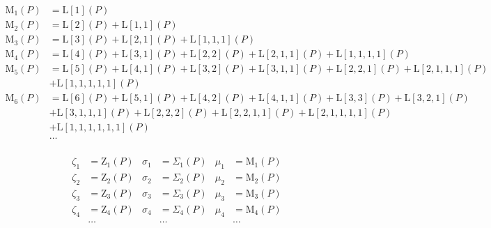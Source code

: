 \begin{equation*} \begin{aligned}
\mathrm{M}_1(P) &=
  \mathrm{L}[1](P) \\
%
\mathrm{M}_2(P) &=
  \mathrm{L}[2](P)
+ \mathrm{L}[1,1](P) \\
%
\mathrm{M}_3(P) &=
  \mathrm{L}[3](P)
+ \mathrm{L}[2,1](P)
+ \mathrm{L}[1,1,1](P) \\
%
\mathrm{M}_4(P) &=
  \mathrm{L}[4](P)
+ \mathrm{L}[3,1](P)
+ \mathrm{L}[2,2](P)
+ \mathrm{L}[2,1,1](P)
+ \mathrm{L}[1,1,1,1](P) \\
%
\mathrm{M}_5(P) &=
  \mathrm{L}[5](P)
+ \mathrm{L}[4,1](P)
+ \mathrm{L}[3,2](P)
+ \mathrm{L}[3,1,1](P)
+ \mathrm{L}[2,2,1](P)
+ \mathrm{L}[2,1,1,1](P) \\ &
+ \mathrm{L}[1,1,1,1,1](P) \\
%
\mathrm{M}_6(P) &=
  \mathrm{L}[6](P)
+ \mathrm{L}[5,1](P)
+ \mathrm{L}[4,2](P)
+ \mathrm{L}[4,1,1](P)
+ \mathrm{L}[3,3](P)
+ \mathrm{L}[3,2,1](P) \\ &
+ \mathrm{L}[3,1,1,1](P)
+ \mathrm{L}[2,2,2](P)
+ \mathrm{L}[2,2,1,1](P)
+ \mathrm{L}[2,1,1,1,1](P) \\ &
+ \mathrm{L}[1,1,1,1,1,1](P) \\
%
&\ldots \\
\end{aligned} \end{equation*}

\begin{equation*} \begin{aligned}
\zeta_1 &= \mathrm{Z}_1(P)
&
\sigma_1 &= \Sigma_1(P)
&
\mu_1 &= \mathrm{M}_1(P)
\\
\zeta_2 &= \mathrm{Z}_2(P)
&
\sigma_2 &= \Sigma_2(P)
&
\mu_2 &= \mathrm{M}_2(P)
\\
\zeta_3 &= \mathrm{Z}_3(P)
&
\sigma_3 &= \Sigma_3(P)
&
\mu_3 &= \mathrm{M}_3(P)
\\
\zeta_4 &= \mathrm{Z}_4(P)
&
\sigma_4 &= \Sigma_4(P)
&
\mu_4 &= \mathrm{M}_4(P)
\\
&\ldots
&
&\ldots
&
&\ldots
\\
\end{aligned} \end{equation*}

